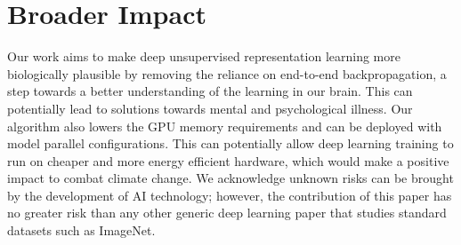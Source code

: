 \section*{Broader Impact}
\vspace{-0.1in}
Our work aims to make deep unsupervised representation learning more biologically plausible by
removing the reliance on end-to-end backpropagation, a step towards a better understanding of the
learning in our brain. This can potentially lead to solutions towards mental and psychological
illness. Our algorithm also lowers the GPU memory requirements and can be deployed with model
parallel configurations. This can potentially allow deep learning training to run on cheaper and
more energy efficient hardware, which would make a positive impact to combat climate change. We
acknowledge unknown risks can be brought by the development of AI technology; however, the
contribution of this paper has no greater risk than any other generic deep learning paper that
studies standard datasets such as ImageNet.


